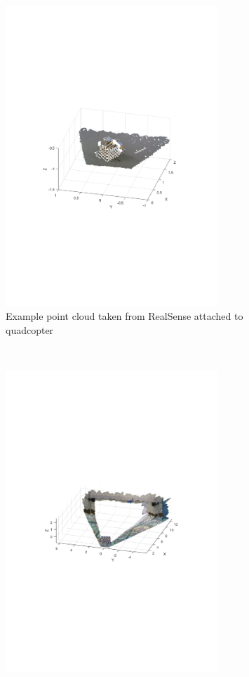 \documentclass[12pt,a4paper]{article}
\begin{document}
  \begin{figure}[b!]
    \begin{subfigure}[t]{\textwidth}
    \centering
      \includegraphics[width=80mm, trim = 100 280 100 290, clip]{pc_investigation/MATLAB_a.pdf}
      \caption{Example point cloud taken from RealSense attached to quadcopter}
      \label{f: pcs quad}
    \end{subfigure}  \\
    \begin{subfigure}[t]{0.5\textwidth}
      \includegraphics[width=80mm, trim = 100 300 100 290, clip]{vicon_test/without.pdf}

\end{subfigure}
\end{figure}
\end{document}

